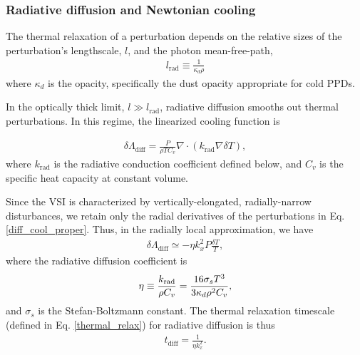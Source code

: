 \subsubsection{Radiative diffusion and Newtonian cooling}
The thermal relaxation of a perturbation depends on the relative sizes of the perturbation's 
lengthscale, $l$, and the photon mean-free-path,
\begin{align}\label{lrad}
  l_\mathrm{rad} \equiv \frac{1}{\kappa_d\rho} 
\end{align}
where $\kappa_d$ is the opacity, specifically the dust opacity appropriate for cold PPDs. 

In the optically thick limit, $l\gg l_\mathrm{rad}$, radiative diffusion smooths out thermal perturbations.
In this regime, the linearized cooling function is

\begin{align}\label{diff_cool_proper}
  \delta \Lambda_\mathrm{diff} = \frac{P}{\rho T C_v} \nabla\cdot\left(k_\mathrm{rad}\nabla\delta
    T\right),  
\end{align}
where $k_\mathrm{rad}$ is the radiative conduction coefficient defined
below, and $C_v$ is the specific heat capacity at constant volume. 

Since the VSI is characterized by vertically-elongated,
radially-narrow disturbances, we retain only the radial derivatives of
the perturbations in Eq. \ref{diff_cool_proper}. 
Thus, in the radially local approximation, we have
\begin{align}\label{diff_cool_approx}
  \delta\Lambda_\mathrm{diff} \simeq %
  -\eta k_x^2 P \frac{\delta T}{T}, %
\end{align}
where the radiative diffusion coefficient is
\begin{align}\label{eta_def}
  \eta \equiv {k_\mathrm{rad} \over \rho C_v} = \frac{16\sigma_s T^3}{3\kappa_d\rho^2 C_v}, 
\end{align}
and $\sigma_s$ is the Stefan-Boltzmann constant. 
The thermal relaxation  timescale (defined in Eq. \ref{thermal_relax}) 
for radiative diffusion is thus 
\begin{align}\label{tc_diff_cool} 
  t_\mathrm{diff} = \frac{1}{\eta k_x^2}.%
\end{align}

